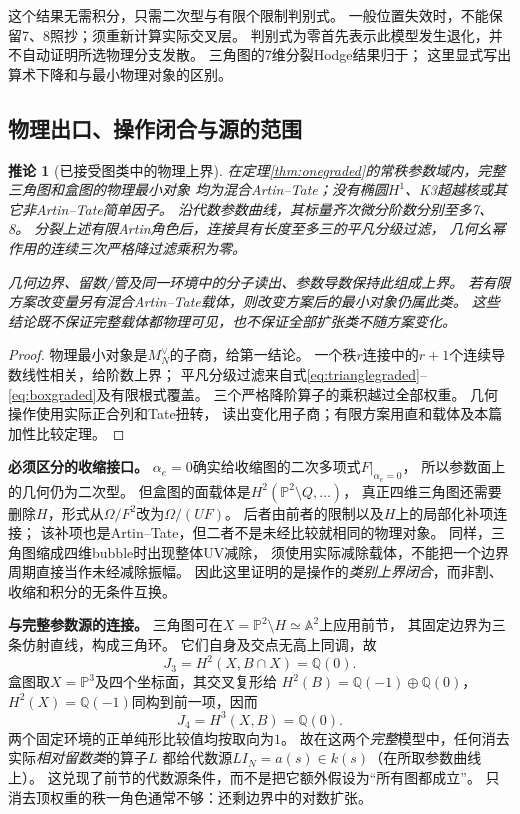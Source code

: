 \documentclass[11pt,a4paper]{ctexart}
\theoremstyle{cnplain}\newtheorem{theorem}{定理}[section]
\newtheorem{corollary}[theorem]{推论}
\theoremstyle{definition}\newtheorem{definition}[theorem]{定义}
\theoremstyle{remark}\newtheorem{remark}[theorem]{注}
\newcommand{\Q}{\mathbb Q}\newcommand{\cC}{\mathcal C}
\begin{document}
这个结果无需积分，只需二次型与有限个限制判别式。
一般位置失效时，不能保留7、8照抄；须重新计算实际交叉层。
判别式为零首先表示此模型发生退化，并不自动证明所选物理分支发散。
三角图的7维分裂Hodge结果归于\cite[Proposition10.1]{BKone}；
这里显式写出算术下降和与最小物理对象的区别。

\subsection{物理出口、操作闭合与源的范围}
\begin{corollary}[已接受图类中的物理上界]\label{cor:oneoperations}
在定理\ref{thm:onegraded}的常秩参数域内，完整三角图和盒图的物理最小对象
均为混合Artin--Tate；没有椭圆$H^1$、K3超越核或其它非Artin--Tate简单因子。
沿代数参数曲线，其标量齐次微分阶数分别至多7、8。
分裂上述有限Artin角色后，连接具有长度至多三的平凡分级过滤，
几何幺幂作用的连续三次严格降过滤乘积为零。

几何边界、留数/管及同一环境中的分子读出、参数导数保持此组成上界。
若有限方案改变量另有混合Artin--Tate载体，则改变方案后的最小对象仍属此类。
这些结论既不保证完整载体都物理可见，也不保证全部扩张类不随方案变化。
\end{corollary}
\begin{proof}
物理最小对象是$M_N^\vee$的子商，给第一结论。
一个秩$r$连接中的$r+1$个连续导数线性相关，给阶数上界；
平凡分级过滤来自式\eqref{eq:trianglegraded}--\eqref{eq:boxgraded}及有限根式覆盖。
三个严格降阶算子的乘积越过全部权重。
几何操作使用实际正合列和Tate扭转，
读出变化用子商；有限方案用直和载体及本篇加性比较定理。
\end{proof}

\textbf{必须区分的收缩接口。}
$\alpha_e=0$确实给收缩图的二次多项式$F|_{\alpha_e=0}$，
所以参数面上的几何仍为二次型。
但盒图的面载体是$H^2(\mathbb P^2\setminus Q,\ldots)$，
真正四维三角图还需要删除$H$，形式从$\Omega/F^2$改为$\Omega/(UF)$。
后者由前者的限制以及$H$上的局部化补项连接；
该补项也是Artin--Tate，但二者不是未经比较就相同的物理对象。
同样，三角图缩成四维bubble时出现整体UV减除，
须使用实际减除载体，不能把一个边界周期直接当作未经减除振幅。
因此这里证明的是操作的\emph{类别上界闭合}，而非割、收缩和积分的无条件互换。

\textbf{与完整参数源的连接。}
三角图可在$X=\mathbb P^2\setminus H\simeq\mathbb A^2$上应用前节，
其固定边界为三条仿射直线，构成三角环。
它们自身及交点无高上同调，故
\[
 J_3=H^2(X,B\cap X)=\Q(0).
\]
盒图取$X=\mathbb P^3$及四个坐标面，其交叉复形给
$H^2(B)=\Q(-1)\oplus\Q(0)$，
$H^2(X)=\Q(-1)$同构到前一项，因而
\[
 J_4=H^3(X,B)=\Q(0).
\]
两个固定环境的正单纯形比较值均按取向为$1$。
故在这两个\emph{完整}模型中，任何消去实际\emph{相对留数类}的算子$L$
都给代数源$LI_N=a(s)\in k(s)$（在所取参数曲线上）。
这兑现了前节的代数源条件，而不是把它额外假设为“所有图都成立”。
只消去顶权重的秩一角色通常不够：还剩边界中的对数扩张。
\end{document}

